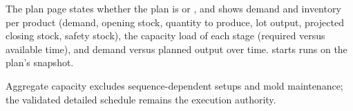 
The plan page states whether the plan is  or , and shows demand and inventory per product (demand, opening stock, quantity to produce, lot output,
projected closing stock, safety stock), the capacity load of each stage (required versus available time), and
demand versus planned output over time.  starts runs on the plan's snapshot.

\begin{note}
Aggregate capacity excludes sequence-dependent setups and mold maintenance; the validated detailed schedule
remains the execution authority.
\end{note}
